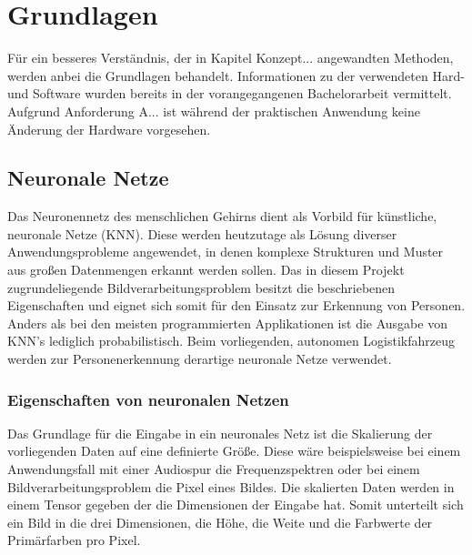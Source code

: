 \chapter{Grundlagen}
\label{ch: Grundlagen}
	Für ein besseres Verständnis, der in Kapitel Konzept... angewandten Methoden, werden anbei die Grundlagen behandelt. Informationen zu der verwendeten Hard- und Software wurden bereits in der vorangegangenen Bachelorarbeit vermittelt. Aufgrund Anforderung A... ist während der praktischen Anwendung keine Änderung der Hardware vorgesehen.
 
	
 	\section{Neuronale Netze}
	\label{sec: ROS}
	
	Das Neuronennetz des menschlichen Gehirns dient als Vorbild für künstliche, neuronale Netze (KNN). Diese werden heutzutage als Lösung diverser Anwendungsprobleme angewendet, in denen komplexe Strukturen und Muster aus großen Datenmengen erkannt werden sollen. Das in diesem Projekt zugrundeliegende Bildverarbeitungsproblem besitzt die beschriebenen Eigenschaften und eignet sich somit für den Einsatz zur Erkennung von Personen. Anders als bei den meisten programmierten Applikationen ist die Ausgabe von KNN's lediglich probabilistisch. Beim vorliegenden, autonomen Logistikfahrzeug werden zur Personenerkennung derartige neuronale Netze verwendet.
	
		\subsection{Eigenschaften von neuronalen Netzen}
		\label{subsec: Eigenschaften von neuronalen Netzen}
		Das Grundlage für die Eingabe in ein neuronales Netz ist die Skalierung der vorliegenden Daten auf eine definierte Größe. Diese wäre beispielsweise bei einem Anwendungsfall mit einer Audiospur die Frequenzspektren oder bei einem Bildverarbeitungsproblem die Pixel eines Bildes. Die skalierten Daten werden in einem Tensor gegeben der die Dimensionen der Eingabe hat. Somit unterteilt sich ein Bild in die drei Dimensionen, die Höhe, die Weite und die Farbwerte der Primärfarben pro Pixel.\\
		

